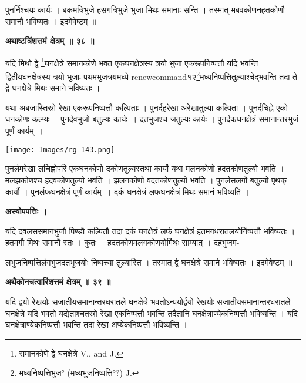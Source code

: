 \documentclass[11pt, openany]{book}
\begin{document}
पुनर्निश्चयः कार्यः । बकमत्रिभुजे हसगत्रिभुजे भुजा मिथः समानाः सन्ति । तस्मात् मबवकोणनहतकोणौ समानौ भविष्यतः । इदमेवेष्टम् ॥

\newpage
\begin{center}
\textbf{\large अथाष्टत्रिंशत्तमं क्षेत्रम् ॥ ३८ ॥}
\end{center}
\vspace{5mm}

{\ab यदि मिथो द्वे \renewcommand{\thefootnote}{१}\footnote{समानकोणे द्वे घनक्षेत्रे {\en V., and J.}}घनक्षेत्रे समानकोणे भवत एकघनक्षेत्रस्य त्रयो भुजा एकरूपनिष्पत्तौ यदि भवन्ति द्वितीयघनक्षेत्रस्य त्रयो भुजाः प्रथमभुजत्रयमध्ये renewcommand{\thefootnote}{२}\footnote{मध्यनिष्पत्तिभुज° (मध्यभुजनिष्पत्ति°?) {\en J.}}मध्यनिष्पत्तितुल्याश्चेद्भवन्ति तदा ते द्वे घनक्षेत्रे मिथः समाने भविष्यतः ।}\\
\vspace{3mm}

यथा अबजास्तिस्रो रेखा एकरूपनिष्पत्तौ कल्पिताः । पुनर्दहरेखा अरेखातुल्या कल्पिता । पुनर्दचिह्ने एको धनकोणः कल्प्यः । पुनर्दवभुजो बतुल्यः कार्यः~। दतभुजश्च जतुल्यः कार्यः । पुनर्दकधनक्षेत्रं समानान्तरभुजं पूर्णं कार्यम्~।

\begin{center}
 \texttt{[image: Images/rg-143.png]}  
 \end{center} 
पुनर्लमरेखा लचिह्नोपरि एकघनकोणो दकोणतुल्यस्तथा कार्यो यथा मलनकोणो हदतकोणतुल्यो भवति । मलझकोणश्च हदवकोणतुल्यो भवति । झलनकोणो वदतकोणतुल्यो भवति । पुनर्लसलगौ बतुल्यो पृथक् कार्यौ । पुनर्लफघनक्षेत्रं पूर्णं कार्यम्~। दकं घनक्षेत्रं
लफघनक्षेत्रं मिथः समानं भविष्यति ।\\
\begin{center}
\textbf{अस्योपपत्तिः ।}
\end{center}
\vspace{5mm}

 यदि दवलससमानभुजौ पिण्डौ कल्पितौ तदा दकं घनक्षेत्रं लफं घनक्षेत्रं हतमगधरातलयोर्निष्पत्तौ भविष्यतः । हतमगौ मिथः समानौ स्तः । कुतः । हदतकोणमलगकोणयोर्मिथः साम्यात् । दहभुजम-

\newpage
\noindent लभुजनिष्पत्तिर्लगभुजदतभुजयोः निष्पत्त्या तुल्यास्ति । तस्मात् द्वे घनक्षेत्रे समाने भविष्यतः । इदमेवेष्टम् ॥\\
\begin{center}
\textbf{\large अथैकोनचत्वारिंशत्तमं क्षेत्रम् ॥ ३९ ॥}
\end{center}
\vspace{5mm}

{\ab यदि द्वयो रेखयोः सजातीयसमानान्तरधरातले घनक्षेत्रे भवतोऽन्ययोर्द्वयो रेखयोः सजातीयसमानान्तरधरातले घनक्षेत्रे यदि भवतो यद्येताश्चतस्रो रेखा एकनिष्पत्तौ भवन्ति तदैतानि घनक्षेत्राण्येकनिष्पत्तौ भविष्यन्ति । यदि घनक्षेत्राण्येकनिष्पत्तौ भवन्ति तदा रेखा अप्येकनिष्पत्तौ भविष्यन्ति ।}\\
\vspace{5mm}
\end{document}
